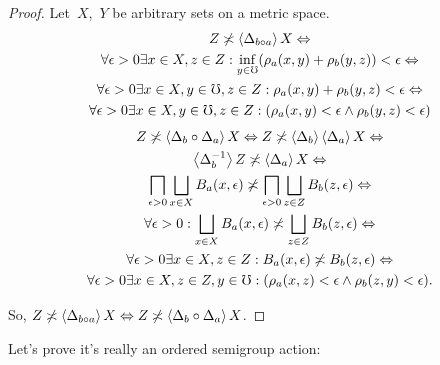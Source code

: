 \begin{proof}
Let~$X$,~$Y$ be arbitrary sets on a metric space.
\begin{multline*}
Z\not\asymp\left\langle \Delta_{b\circ a}\right\rangle X \Leftrightarrow \\
\forall\epsilon>0\exists x\in X,z\in Z:\inf_{y\in\mho}(\rho_a(x,y)+\rho_b(y,z))<\epsilon \Leftrightarrow \\
\forall\epsilon>0\exists x\in X,y\in\mho,z\in Z:\rho_a(x,y)+\rho_b(y,z)<\epsilon \Leftrightarrow \\
\forall\epsilon>0\exists x\in X,y\in\mho,z\in Z:(\rho_a(x,y)<\epsilon\land\rho_b(y,z)<\epsilon)
\end{multline*}
\begin{multline*}
Z\nasymp\supfun{\Delta_b\circ\Delta_a}X \Leftrightarrow
Z\nasymp\supfun{\Delta_b}\supfun{\Delta_a}X\Leftrightarrow\\
\supfun{\Delta_b^{-1}}Z\nasymp\supfun{\Delta_a}X \Leftrightarrow\\
\bigsqcap_{\epsilon>0}\bigsqcup_{x\in X}B_a(x,\epsilon) \nasymp\bigsqcap_{\epsilon>0}\bigsqcup_{z\in Z}B_b(z,\epsilon) \Leftrightarrow \\
\forall\epsilon>0:\bigsqcup_{x\in X}B_a(x,\epsilon) \nasymp\bigsqcup_{z\in Z}B_b(z,\epsilon) \Leftrightarrow \\
\forall\epsilon>0\exists x\in X,z\in Z:B_a(x,\epsilon)\nasymp B_b(z,\epsilon) \Leftrightarrow \\
\forall\epsilon>0\exists x\in X,z\in Z,y\in\mho:(\rho_a(x,z)<\epsilon\land\rho_b(z,y)<\epsilon).
\end{multline*}

So, $Z\not\asymp\left\langle \Delta_{b\circ a}\right\rangle X \Leftrightarrow Z\not\asymp\left\langle \Delta_b\circ\Delta_a\right\rangle X$.
\end{proof}

Let's prove it's really an ordered semigroup action:

